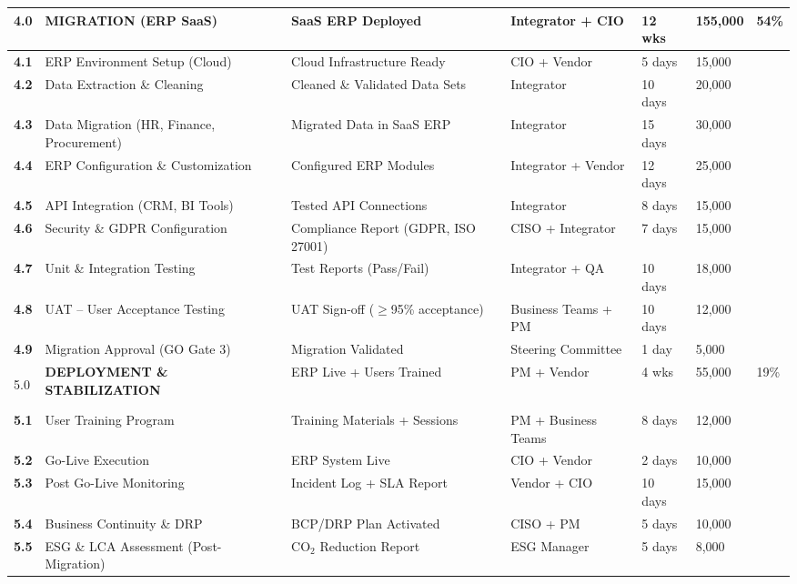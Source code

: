 \begin{longtable}{|>{\bfseries}p{1.1cm}|p{3.4cm}|p{3.1cm}|p{2.2cm}|p{1.0cm}|p{1.4cm}|p{0.8cm}|}
    \rowcolor{tableheader}
    4.0 & \textbf{MIGRATION (ERP SaaS)} & SaaS ERP Deployed & Integrator + CIO & 12 wks & 155{,}000 & 54\% \\
    \hline
    4.1 & ERP Environment Setup (Cloud) & Cloud Infrastructure Ready & CIO + Vendor & 5 days & 15{,}000 & \\
    \hline
    4.2 & Data Extraction \& Cleaning & Cleaned \& Validated Data Sets & Integrator & 10 days & 20{,}000 & \\
    \hline
    4.3 & Data Migration (HR, Finance, Procurement) & Migrated Data in SaaS ERP & Integrator & 15 days & 30{,}000 & \\
    \hline
    4.4 & ERP Configuration \& Customization & Configured ERP Modules & Integrator + Vendor & 12 days & 25{,}000 & \\
    \hline
    4.5 & API Integration (CRM, BI Tools) & Tested API Connections & Integrator & 8 days & 15{,}000 & \\
    \hline
    4.6 & Security \& GDPR Configuration & Compliance Report (GDPR, ISO 27001) & CISO + Integrator & 7 days & 15{,}000 & \\
    \hline
    4.7 & Unit \& Integration Testing & Test Reports (Pass/Fail) & Integrator + QA & 10 days & 18{,}000 & \\
    \hline
    4.8 & UAT -- User Acceptance Testing & UAT Sign-off ($\geq$95\% acceptance) & Business Teams + PM & 10 days & 12{,}000 & \\
    \hline
    4.9 & Migration Approval (GO Gate 3) & Migration Validated & Steering Committee & 1 day & 5{,}000 & \\
    \hline

    \rowcolor{tableheader}
    5.0 & \textbf{DEPLOYMENT \& STABILIZATION} & ERP Live + Users Trained & PM + Vendor & 4 wks & 55{,}000 & 19\% \\
    \hline
    5.1 & User Training Program & Training Materials + Sessions & PM + Business Teams & 8 days & 12{,}000 & \\
    \hline
    5.2 & Go-Live Execution & ERP System Live & CIO + Vendor & 2 days & 10{,}000 & \\
    \hline
    5.3 & Post Go-Live Monitoring & Incident Log + SLA Report & Vendor + CIO & 10 days & 15{,}000 & \\
    \hline
    5.4 & Business Continuity \& DRP & BCP/DRP Plan Activated & CISO + PM & 5 days & 10{,}000 & \\
    \hline
    5.5 & ESG \& LCA Assessment (Post-Migration) & CO$_2$ Reduction Report & ESG Manager & 5 days & 8{,}000 & \\
    \hline


\end{longtable}
